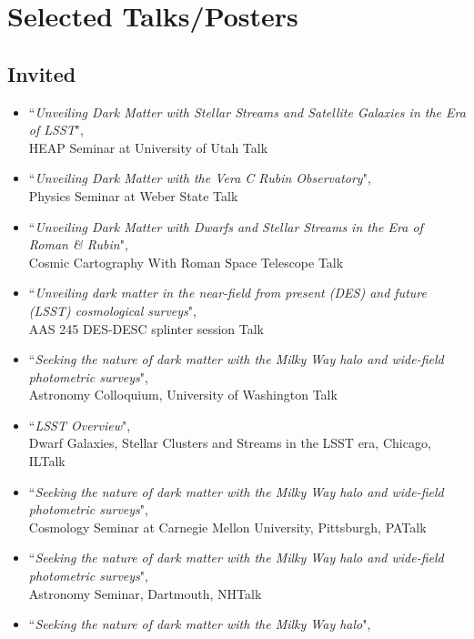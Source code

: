 \documentclass[11pt,letterpaper, sans]{moderncv}        %
\begin{document}
\section{Selected Talks/Posters}
\subsection{Invited}
\begin{itemize}[itemsep=1pt, leftmargin=28pt]
    \item [2026] ``\textit{Unveiling Dark Matter with Stellar Streams and Satellite Galaxies in the Era of LSST}",\\
    HEAP Seminar at University of Utah  \hfill Talk
    \item [2026] ``\textit{Unveiling Dark Matter with the Vera C Rubin Observatory}",\\
    Physics Seminar at Weber State  \hfill Talk
    \item [2025] ``\textit{Unveiling Dark Matter with Dwarfs and Stellar Streams in the Era of Roman \& Rubin}",\\
    Cosmic Cartography With Roman Space Telescope \hfill Talk
    \item [2025] ``\textit{Unveiling dark matter in the near-field from present (DES) and future (LSST) cosmological surveys}",\\
    AAS 245 DES-DESC splinter session \hfill Talk
    \item [2024] ``\textit{Seeking the nature of dark matter with the Milky Way halo and wide-field photometric surveys}", \\
    Astronomy Colloquium, University of Washington \hfill Talk
    \item [2024] ``\textit{LSST Overview}",\\
    Dwarf Galaxies, Stellar Clusters and Streams in the LSST era, Chicago, IL\hfill Talk
    \item [2024] ``\textit{Seeking the nature of dark matter with the Milky Way halo and wide-field photometric surveys}", \\
    Cosmology Seminar at Carnegie Mellon University, Pittsburgh, PA\hfill Talk
    \item [2024] ``\textit{Seeking the nature of dark matter with the Milky Way halo and wide-field photometric surveys}", \\
    Astronomy Seminar, Dartmouth, NH\hfill Talk
    \item [2024] ``\textit{Seeking the nature of dark matter with the Milky Way halo}", \\

\end{itemize}
\end{document}
